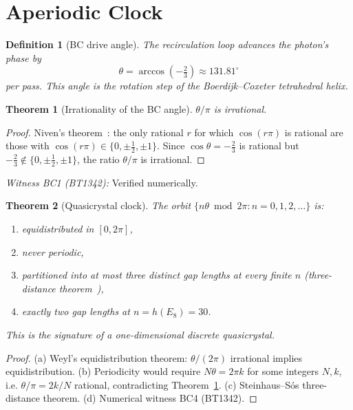 \documentclass[prl,twocolumn,showpacs,superscriptaddress,longbibliography]{revtex4-2}
\newtheorem{theorem}{Theorem}
\newtheorem{definition}{Definition}
\begin{document}
\section{Aperiodic Clock}\label{sec:clock}

\begin{definition}[BC drive angle]
The recirculation loop advances the photon's phase by
\begin{equation}
  \theta = \arccos\!\left(-\tfrac{2}{3}\right)
  \approx 131.81^\circ
  \label{eq:bcangle}
\end{equation}
per pass. This angle is the rotation step of the
Boerdijk--Coxeter tetrahedral helix.
\end{definition}

\begin{theorem}[Irrationality of the BC angle]\label{thm:niven}
$\theta/\pi$ is irrational.
\end{theorem}
\begin{proof}
Niven's theorem~\cite{Niven1956}: the only rational $r$ for
which $\cos(r\pi)$ is rational are those with
$\cos(r\pi)\in\{0,\pm\tfrac{1}{2},\pm 1\}$.
Since $\cos\theta = -\tfrac{2}{3}$ is rational
but $-\tfrac{2}{3}\notin\{0,\pm\tfrac{1}{2},\pm 1\}$,
the ratio $\theta/\pi$ is irrational.
\end{proof}

\noindent\emph{Witness BC1 (BT1342):} Verified numerically.

\begin{theorem}[Quasicrystal clock]\label{thm:quasi}
The orbit $\{n\theta \bmod 2\pi : n=0,1,2,\ldots\}$ is:
\begin{enumerate}
  \item[(a)] equidistributed in $[0,2\pi]$,
  \item[(b)] never periodic,
  \item[(c)] partitioned into at most three distinct gap lengths
  at every finite $n$ (three-distance theorem~\cite{Steinhaus1958}),
  \item[(d)] exactly two gap lengths at $n = h(E_8) = 30$.
\end{enumerate}
This is the signature of a one-dimensional discrete quasicrystal.
\end{theorem}
\begin{proof}
(a) Weyl's equidistribution theorem: $\theta/(2\pi)$ irrational
implies equidistribution.
(b) Periodicity would require $N\theta = 2\pi k$ for some integers
$N,k$, i.e. $\theta/\pi = 2k/N$ rational, contradicting
Theorem~\ref{thm:niven}.
(c) Steinhaus--S\'os three-distance theorem.
(d) Numerical witness BC4 (BT1342).
\end{proof}
\end{document}

